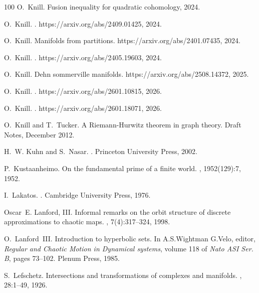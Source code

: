 \documentclass[12pt]{amsart}
\begin{document}
\begin{thebibliography}{100}
O.~Knill.
\newblock Fusion inequality for quadratic cohomology, 2024.

O.~Knill.
.
\newblock https://arxiv.org/abs/2409.01425, 2024.

O.~Knill.
\newblock Manifolds from partitions.
\newblock https://arxiv.org/abs/2401.07435, 2024.

O.~Knill.
.
\newblock https://arxiv.org/abs/2405.19603, 2024.

O.~Knill.
\newblock Dehn sommerville manifolds.
\newblock https://arxiv.org/abs/2508.14372, 2025.

O.~Knill.
.
\newblock https://arxiv.org/abs/2601.10815, 2026.

O.~Knill.
.
\newblock https://arxiv.org/abs/2601.18071, 2026.

O.~Knill and T.~Tucker.
\newblock A {R}iemann-{H}urwitz theorem in graph theory.
\newblock Draft Notes, December 2012.

H.~W. Kuhn and S.~Nasar.
.
\newblock Princeton University Press, 2002.

P.~Kustaanheimo.
\newblock On the fundamental prime of a finite world.
, 1952(129):7,
  1952.

I.~Lakatos.
.
\newblock Cambridge University Press, 1976.

Oscar~E. Lanford, III.
\newblock Informal remarks on the orbit structure of discrete approximations to
  chaotic maps.
, 7(4):317--324, 1998.

O.~{Lanford~III}.
\newblock Introduction to hyperbolic sets.
\newblock In A.S.Wightman G.Velo, editor, {\em Regular and Chaotic Motion in
  Dynamical systems}, volume 118 of {\em Nato ASI Ser. B}, pages 73--102.
  Plenum Press, 1985.

S.~Lefschetz.
\newblock Intersections and transformations of complexes and manifolds.
, 28:1--49, 1926.


\end{thebibliography}
\end{document}
